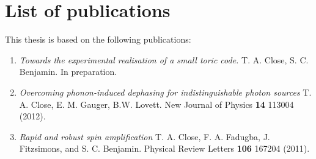 
\section*{List of publications} 

This thesis is based on the following publications: %

\begin{enumerate}
\item \emph{Towards the experimental realisation of a small toric code.} 
T. A. Close, S. C. Benjamin. In preparation.

\item \emph{Overcoming phonon-induced dephasing for indistinguishable photon sources} 
T. A. Close, E. M. Gauger, B.W. Lovett. New Journal of Physics \textbf{14} 113004 (2012). 

\item \emph{Rapid and robust spin amplification}
T. A. Close, F. A. Fadugba, J. Fitzsimons, and S. C. Benjamin.  Physical Review Letters \textbf{106} 167204 (2011).


\end{enumerate}
